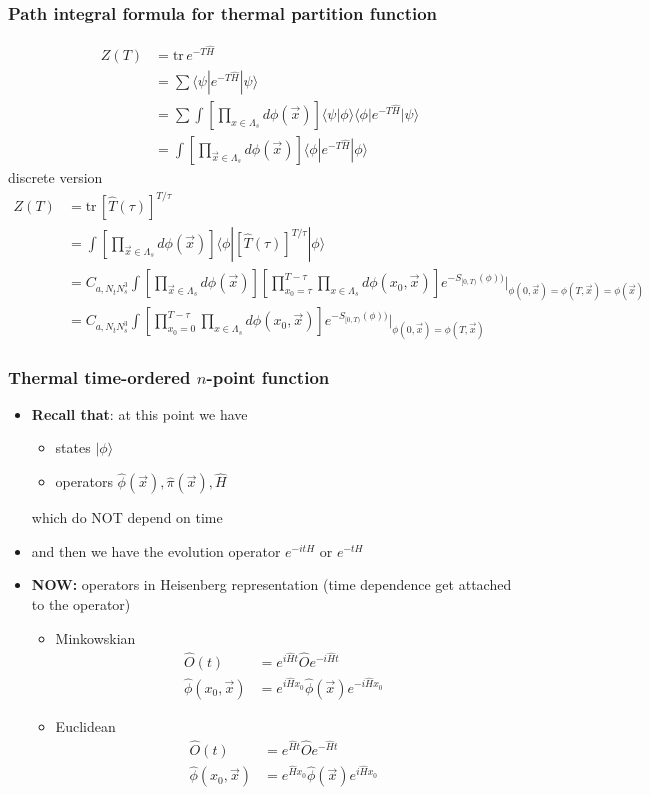 \documentclass[10pt,a4paper]{article}
\theoremstyle{definition}
\begin{document}
\subsubsection{Path integral formula for thermal partition function}
\begin{align}
Z(T)
&=\text{tr}\,e^{-T\hat{H}}\\
&=\sum\langle\psi |e^{-T\hat{H}}|\psi\rangle \\
&=\sum\int[\prod_{x\in\Lambda_s}d\phi(\vec{x})]\langle\psi|\phi\rangle\langle\phi|e^{-T\hat{H}}|\psi\rangle\\
&=\int[\prod_{\vec{x}\in\Lambda_s}d\phi(\vec{x})]\langle\phi|e^{-T\hat{H}}|\phi\rangle
\end{align}
discrete version
\begin{align}
Z(T)
&=\text{tr}\,[\hat{T}(\tau)]^{T/\tau}\\
&=\int[\prod_{\vec{x}\in\Lambda_s}d\phi(\vec{x})]\langle\phi|[\hat{T}(\tau)]^{T/\tau}|\phi\rangle\\
&=C_{a,N_tN_s^3}\int[\prod_{\vec{x}\in\Lambda_s}d\phi(\vec{x})][\prod_{x_0=\tau}^{T-\tau}\prod_{x\in\Lambda_s}d\phi(x_0,\vec{x})]e^{-S_{[0,T)}(\phi))}|_{\phi(0,\vec{x})=\phi(T,\vec{x})=\phi(\vec{x})}\\
&=C_{a,N_tN_s^3}\int[\prod_{x_0=0}^{T-\tau}\prod_{x\in\Lambda_s}d\phi(x_0,\vec{x})]e^{-S_{[0,T)}(\phi))}|_{\phi(0,\vec{x})=\phi(T,\vec{x})}
\end{align}
\subsubsection{Thermal time-ordered $n$-point function}
\begin{itemize}
\item {\bf Recall that}: at this point we have 
\begin{itemize}
\item states $|\phi\rangle$
\item operators $\hat{\phi}(\vec{x}), \hat{\pi}(\vec{x}), \hat{H}$
\end{itemize} 
which do NOT depend on time 
\item and then we have the evolution operator $e^{-itH}$ or $e^{-tH}$
\item {\bf NOW:} operators in Heisenberg representation (time dependence get attached to the operator)
\begin{itemize}
\item Minkowskian
\begin{align}
\hat{O}(t)&=e^{i\hat{H}t}\hat{O}e^{-i\hat{H}t}\\
\hat{\phi}(x_0,\vec{x})&=e^{i\hat{H}x_0}\hat{\phi}(\vec{x})e^{-i\hat{H}x_0}
\end{align}
\item Euclidean
\begin{align}
\hat{O}(t)&=e^{\hat{H}t}\hat{O}e^{-\hat{H}t}\\
\hat{\phi}(x_0,\vec{x})&=e^{\hat{H}x_0}\hat{\phi}(\vec{x})e^{i\hat{H}x_0}
\end{align}
\end{itemize}

\end{itemize}
\end{document}
